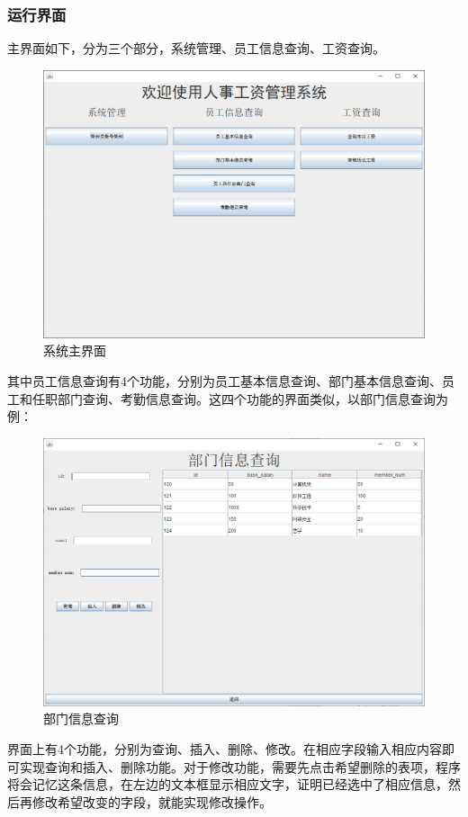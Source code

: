 \documentclass[withoutpreface,bwprint]{cumcmthesis} %
\begin{document}
\subsubsection{运行界面}
主界面如下，分为三个部分，系统管理、员工信息查询、工资查询。
\begin{figure}[H]
    \centering
    \includegraphics[width=1\linewidth]{main}
    \caption{系统主界面}
\end{figure}
其中员工信息查询有4个功能，分别为员工基本信息查询、部门基本信息查询、员工和任职部门查询、考勤信息查询。这四个功能的界面类似，以部门信息查询为例：
\begin{figure}[H]
    \centering
    \includegraphics[width=1\linewidth]{department}
    \caption{部门信息查询}
\end{figure}
界面上有4个功能，分别为查询、插入、删除、修改。在相应字段输入相应内容即可实现查询和插入、删除功能。对于修改功能，需要先点击希望删除的表项，程序将会记忆这条信息，在左边的文本框显示相应文字，证明已经选中了相应信息，然后再修改希望改变的字段，就能实现修改操作。
\end{document}
